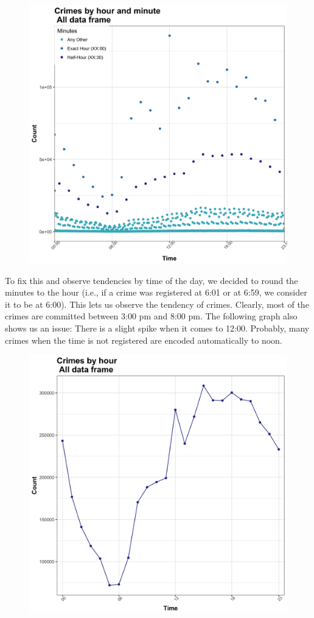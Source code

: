 \documentclass{article}
\begin{document}
\begin{figure}[H]
\centering
\includegraphics[scale=0.15]{4_HourMinute.png}
\end{figure}

To fix this and observe tendencies by time of the day, we decided to round the minutes to the hour (i.e., if a crime was registered at 6:01 or at 6:59, we consider it to be at 6:00). This lets us observe the tendency of crimes. Clearly, most of the crimes are committed between 3:00 pm and 8:00 pm. The following graph also shows us an issue: There is a slight spike when it comes to 12:00. Probably, many crimes when the time is not registered are encoded automatically to noon. 

\begin{figure}[H]
\centering
\includegraphics[scale=0.15]{5_Hour.png}
\end{figure}
\end{document}
